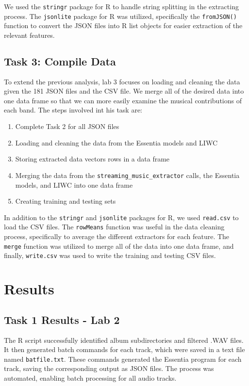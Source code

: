 \documentclass{article}\usepackage[]{graphicx}\usepackage[]{xcolor}
\begin{document}
\begin{multicols}{2}
We used the \texttt{stringr} package for R \citep{stringr} to handle string splitting in the extracting process. The \texttt{jsonlite} package for R \citep{jsonlite} was utilized, specifically the \texttt{fromJSON()} function to convert the JSON files into R list objects for easier extraction of the relevant features. 

\pagebreak

\subsection{Task 3: Compile Data}
To extend the previous analysis, lab 3 focuses on loading and cleaning the data given the 181 JSON files and the CSV file. We merge all of the desired data into one data frame so that we can more easily examine the musical contributions of each band. The steps involved int his task are:

\begin{enumerate} 
  \item Complete Task 2 for all JSON files 
  \item Loading and cleaning the data from the Essentia models and LIWC
  \item Storing extracted data vectors rows in a data frame
  \item Merging the data from the \texttt{streaming\_music\_extractor} calls, the Essentia models, and LIWC into one data frame
  \item Creating training and testing sets
\end{enumerate}

In addition to the \texttt{stringr} \citep{stringr} and \texttt{jsonlite} \citep{jsonlite} packages for R, we used \texttt{read.csv} to load the CSV files. The \texttt{rowMeans} function was useful in the data cleaning process, specifically to average the different extractors for each feature. The \texttt{merge} function was utilized to merge all of the data into one data frame, and finally, \texttt{write.csv} was used to write the training and testing CSV files.

\section{Results}

\subsection{Task 1 Results - Lab 2}
The R script successfully identified album subdirectories and filtered .WAV files. It then generated batch commands for each track, which were saved in a text file named \texttt{batfile.txt}. These commands generated the Essentia program for each track, saving the corresponding output as JSON files. The process was automated, enabling batch processing for all audio tracks.


\end{multicols}
\end{document}
